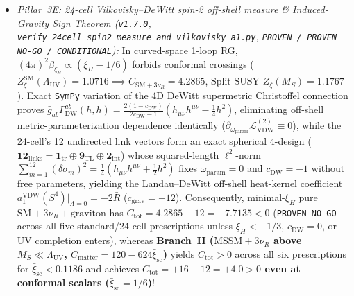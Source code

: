 \documentclass[11pt,a4paper]{article}
\begin{document}
\begin{enumerate}
\begin{itemize}
        \item \emph{Pillar~3E: 24-cell Vilkovisky--DeWitt spin-2 off-shell measure \& Induced-Gravity Sign Theorem (\texttt{v1.7.0}, \texttt{verify\_\allowbreak 24cell\_\allowbreak spin2\_\allowbreak measure\_\allowbreak and\_\allowbreak vilkovisky\_\allowbreak a1.py}, \texttt{PROVEN / PROVEN NO-GO / CONDITIONAL}):} In curved-space 1-loop RG, $(4\pi)^2\beta_{\xi_H}\propto(\xi_H-1/6)$ forbids conformal crossings ($Z_\xi^{\mathrm{SM}}(\Lambda_{\mathrm{UV}})=1.0716\implies C_{\mathrm{SM}+3\nu_R}=4.2865$, Split-SUSY $Z_\xi(M_S)=1.1767$). Exact \texttt{SymPy} variation of the 4D DeWitt supermetric Christoffel connection \cite{Vilkovisky1984,ChristensenDuff1980} proves $\bar g_{ab}\Gamma_{\mathrm{DW}}^{ab}(h,h)=\frac{2(1-c_{\mathrm{DW}})}{2c_{\mathrm{DW}}-1}(h_{\mu\nu}h^{\mu\nu}-\frac{1}{4}h^2)$, eliminating off-shell metric-parameterization dependence identically ($\partial_{\omega_{\mathrm{param}}}\mathcal{L}_{\mathrm{VDW}}^{(2)}\equiv 0$), while the 24-cell's 12 undirected link vectors form an exact spherical 4-design ($\mathbf{12}_{\mathrm{links}}=\mathbf{1}_{\mathrm{tr}}\oplus\mathbf{9}_{\mathrm{TL}}\oplus\mathbf{2}_{\mathrm{int}}$) whose squared-length $\ell^2$-norm $\sum_{m=1}^{12}(\delta\sigma_m)^2 = \frac{1}{4}(h_{\mu\nu}h^{\mu\nu}+\frac{1}{2}h^2)$ fixes $\omega_{\mathrm{param}}=0$ and $c_{\mathrm{DW}}=-1$ without free parameters, yielding the Landau--\allowbreak DeWitt off-shell heat-kernel coefficient $a_1^{\mathrm{VDW}}(S^4)|_{\Lambda=0}=-2\bar R$ ($c_{\mathrm{grav}}=-12$). Consequently, minimal-$\xi_H$ pure $\mathrm{SM}+3\nu_R+\text{graviton}$ has $C_{\mathrm{tot}}=4.2865-12=-7.7135<0$ (\texttt{PROVEN NO-GO} across all five standard/24-cell prescriptions unless $\xi_H<-1/3$, $c_{\mathrm{DW}}=0$, or UV completion enters), whereas \textbf{Branch~II ($\mathrm{MSSM}+3\nu_R$ above $M_S\ll\Lambda_{\mathrm{UV}}$, $C_{\mathrm{matter}}=120-624\bar\xi_{\mathrm{sc}}$)} yields $C_{\mathrm{tot}}>0$ across all six prescriptions for $\bar\xi_{\mathrm{sc}}<0.1186$ and achieves \textbf{$C_{\mathrm{tot}}=+16-12=+4.0>0$ even at conformal scalars ($\bar\xi_{\mathrm{sc}}=1/6$)}!
    \end{itemize}
\end{enumerate}
\end{document}

